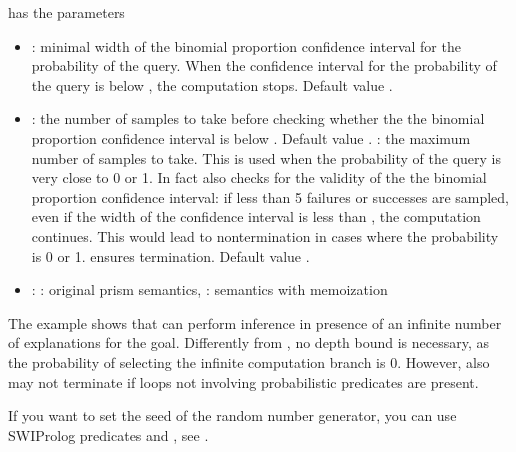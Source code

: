\documentclass[letterpaper,10pt,english]{sphinxmanual}
\begin{document}
\sphinxAtStartPar
{} has the parameters
\begin{itemize}
\item {} 
\sphinxAtStartPar
{}: minimal width of the binomial proportion confidence interval for the probability of the query. When the confidence interval for the probability of the query is below , the computation stops. Default value .

\item {} 
\sphinxAtStartPar
{}: the number of samples to take before checking whether the the binomial proportion confidence interval is below . Default value . : the maximum number of samples to take. This is used when the probability of the query is very close to 0 or 1. In fact  also checks for the validity of the the binomial proportion confidence interval: if less than 5 failures or successes are sampled, even if the width of the confidence interval is less than , the computation continues. This would lead to non\sphinxhyphen{}termination in cases where the probability is 0 or 1.  ensures termination. Default value .

\item {} 
\sphinxAtStartPar
{}: : original prism semantics, : semantics with memoization

\end{itemize}

\sphinxAtStartPar
The example  shows that  can perform inference in presence of an infinite number of explanations for the goal.
Differently from , no depth bound is necessary, as the probability of selecting the infinite computation branch is 0.
However, also  may not terminate if loops not involving probabilistic predicates are present.

\sphinxAtStartPar
If you want to set the seed of the random number generator, you can use SWI\sphinxhyphen{}Prolog predicates  and , see .
\end{document}
